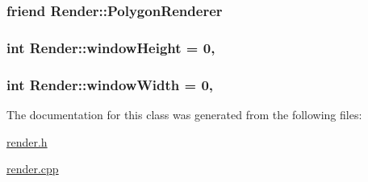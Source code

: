\subsubsection[{Polygon\+Renderer}]{\setlength{\rightskip}{0pt plus 5cm}friend {\bf Render\+::\+Polygon\+Renderer}\hspace{0.3cm}{\ttfamily [private]}}\label{classRender_a71b1d6988fe8a9ab6c0c664216f327fe}
\hypertarget{classRender_a0d4491ee8fe250d915a93019e2575350}{}
\subsubsection[{window\+Height}]{\setlength{\rightskip}{0pt plus 5cm}int Render\+::window\+Height = 0\hspace{0.3cm}{\ttfamily [static]}, {\ttfamily [private]}}\label{classRender_a0d4491ee8fe250d915a93019e2575350}
\hypertarget{classRender_a4f5a1e0ff84b8e48c6dcb1409926110a}{}
\subsubsection[{window\+Width}]{\setlength{\rightskip}{0pt plus 5cm}int Render\+::window\+Width = 0\hspace{0.3cm}{\ttfamily [static]}, {\ttfamily [private]}}\label{classRender_a4f5a1e0ff84b8e48c6dcb1409926110a}


The documentation for this class was generated from the following files\+:\begin{DoxyCompactItemize}
\item 
\hyperlink{render_8h}{render.\+h}\item 
\hyperlink{render_8cpp}{render.\+cpp}\end{DoxyCompactItemize}
